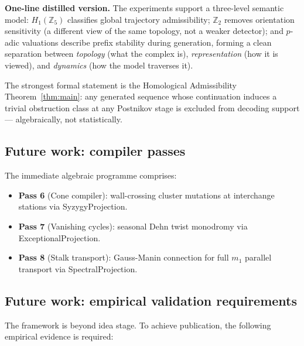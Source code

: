 \documentclass[11pt,a4paper]{article}
\begin{document}
\medskip\noindent
\textbf{One-line distilled version.}
The experiments support a three-level semantic model:
$H_1(\mathbb{Z}_5)$ classifies global trajectory admissibility;
$\mathbb{Z}_2$ removes orientation sensitivity (a different view of
the same topology, not a weaker detector);
and $p$-adic valuations describe prefix stability during generation,
forming a clean separation between
\emph{topology} (what the complex is),
\emph{representation} (how it is viewed), and
\emph{dynamics} (how the model traverses it).

The strongest formal statement is the Homological Admissibility
Theorem~\ref{thm:main}: any generated sequence whose continuation
induces a trivial obstruction class at any Postnikov stage is
excluded from decoding support --- algebraically, not
statistically.

\subsection*{Future work: compiler passes}

The immediate algebraic programme comprises:
\begin{itemize}
  \item \textbf{Pass 6} (Cone compiler): wall-crossing cluster
        mutations at interchange stations via SyzygyProjection.
  \item \textbf{Pass 7} (Vanishing cycles): seasonal Dehn twist
        monodromy via ExceptionalProjection.
  \item \textbf{Pass 8} (Stalk transport): Gauss-Manin connection
        for full $m_1$ parallel transport via SpectralProjection.
\end{itemize}

\subsection*{Future work: empirical validation requirements}

The framework is beyond idea stage.
To achieve publication, the following empirical evidence is required:
\end{document}
